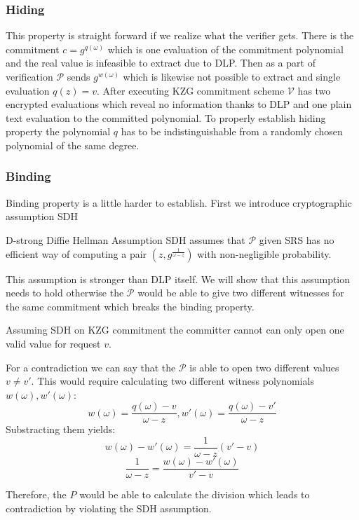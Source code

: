 \subsubsection{Hiding}
This property is straight forward if we realize what the verifier gets. There is the commitment $c = g^{q(\omega)}$ which is one evaluation of the commitment polynomial and the real value is infeasible to extract due to DLP. Then as a part of verification $\mathcal{P}$ sends $g^{w(\omega)}$ which is likewise not possible to extract and single evaluation $q(z) = v$. After executing KZG commitment scheme $\mathcal{V}$ has two encrypted evaluations which reveal no information thanks to DLP and one plain text evaluation to the committed polynomial. To properly establish hiding property the polynomial $q$ has to be indistinguishable from a randomly chosen polynomial of the same degree. %

\subsubsection{Binding}
Binding property is a little harder to establish. First we introduce cryptographic assumption SDH

\begin{definition}{D-strong Diffie Hellman Assumption}
    SDH assumes that $\mathcal{P}$ given SRS has no efficient way of computing a pair $(z, g^{\frac{1}{\omega - z}})$ with non-negligible probability. 
\end{definition}

This assumption is stronger than DLP itself. We will show that this assumption needs to hold otherwise the $\mathcal{P}$ would be able to give two different witnesses for the same commitment which breaks the binding property.

\begin{lemma}
    Assuming SDH on KZG commitment the committer cannot can only open one valid value for request $v$.
\end{lemma}

\begin{dukaz}
    For a contradiction we can say that the $\mathcal{P}$ is able to open two different values $v \neq v'$. This would require calculating two different witness polynomials $w(\omega), w'(\omega)$:
    $$w(\omega) = \frac{q(\omega) - v}{\omega - z}, w'(\omega) = \frac{q(\omega) - v'}{\omega - z}$$
    Substracting them yields:
    $$w(\omega) - w'(\omega) = \frac{1}{\omega - z}  (v' - v)$$
    $$\frac{1}{\omega - z} = \frac{w(\omega) - w'(\omega)}{v' - v}$$

    Therefore, the $P$ would be able to calculate the division which leads to contradiction by violating the SDH assumption.
\end{dukaz}

